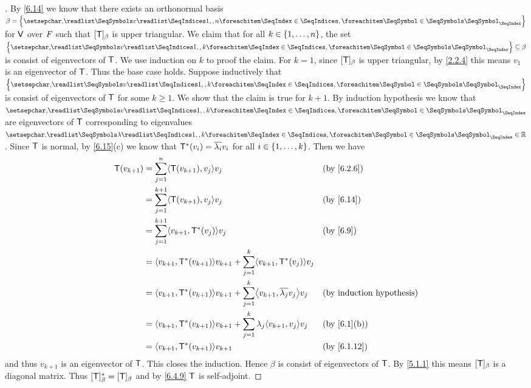 \begin{proof}[]
	By \cref{6.14} we know that there exists an orthonormal basis \(\beta = \set{\seq{v}{1,,n}}\) for \(\mathsf{V}\) over \(\mathit{F}\) such that \([\mathsf{T}]_{\beta}\) is upper triangular.
	We claim that for all \(k \in \left\lbrace1, \dots, n\right\rbrace\), the set \(\set{\seq{v}{1,,k}} \subseteq \beta\) is consist of eigenvectors of \(\mathsf{T}\).
	We use induction on \(k\) to proof the claim.
	For \(k = 1\), since \([\mathsf{T}]_{\beta}\) is upper triangular, by \cref{2.2.4} this means \(v_1\) is an eigenvector of \(\mathsf{T}\).
	Thus the base case holds.
	Suppose inductively that \(\set{\seq{v}{1,,k}}\) is consist of eigenvectors of \(\mathsf{T}\) for some \(k \geq 1\).
	We show that the claim is true for \(k + 1\).
	By induction hypothesis we know that \(\seq{v}{1,,k}\) are eigenvectors of \(\mathsf{T}\) corresponding to eigenvalues \(\seq{\lambda}{1,,k} \in \R\).
	Since \(\mathsf{T}\) is normal, by \cref{6.15}(c) we know that \(\mathsf{T}^*(v_i) = \overline{\lambda_i} v_i\) for all \(i \in \left\lbrace1, \dots, k\right\rbrace\).
	Then we have
	\begin{align*}
		\T(v_{k + 1}) & = \sum_{j = 1}^n \inn{\T(v_{k + 1}), v_j} v_j                                                           &  & \by{6.2.6}                       \\
		              & = \sum_{j = 1}^{k + 1} \inn{\T(v_{k + 1}), v_j} v_j                                                     &  & \by{6.14}                        \\
		              & = \sum_{j = 1}^{k + 1} \inn{v_{k + 1}, \T^*(v_j)} v_j                                                   &  & \by{6.9}                         \\
		              & = \inn{v_{k + 1}, \T^*(v_{k + 1})} v_{k + 1} + \sum_{j = 1}^k \inn{v_{k + 1}, \T^*(v_j)} v_j                                                  \\
		              & = \inn{v_{k + 1}, \T^*(v_{k + 1})} v_{k + 1} + \sum_{j = 1}^k \inn{v_{k + 1}, \conj{\lambda_j} v_j} v_j &  & \text{(by induction hypothesis)} \\
		              & = \inn{v_{k + 1}, \T^*(v_{k + 1})} v_{k + 1} + \sum_{j = 1}^k \lambda_j \inn{v_{k + 1}, v_j} v_j        &  & \by{6.1}[b]                      \\
		              & = \inn{v_{k + 1}, \T^*(v_{k + 1})} v_{k + 1}                                                            &  & \by{6.1.12}
	\end{align*}
	and thus \(v_{k + 1}\) is an eigenvector of \(\mathsf{T}\).
	This closes the induction.
	Hence \(\beta\) is consist of eigenvectors of \(\mathsf{T}\).
	By \cref{5.1.1} this means \([\mathsf{T}]_{\beta}\) is a diagonal matrix.
	Thus \([\mathsf{T}]_{\beta}^* = [\mathsf{T}]_{\beta}\) and by \cref{6.4.9} \(\mathsf{T}\) is self-adjoint.
\end{proof}


